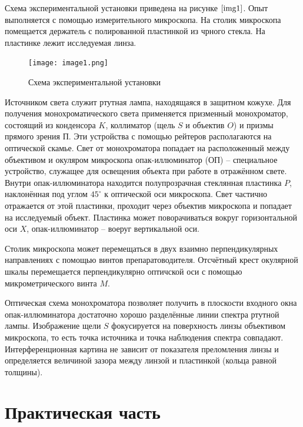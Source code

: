 \documentclass[a4paper,12pt]{article} %
\begin{document}
Схема экспериментальной установки приведена на рисунке $\ref{img1}$. Опыт выполняется с помощью измерительного микроскопа. На столик микроскопа помещается держатель с полированной пластинкой из чрного стекла. На пластинке лежит исследуемая линза.

\begin{figure}[h]
    \begin{center}
        \texttt{[image: image1.png]}
    \end{center}
    \caption{Схема экспериментальной установки}
    \label{img1}
\end{figure}

Источником света служит ртутная лампа, находящаяся в защитном кожухе. Для получения монохроматического света применяется призменный монохроматор, состоящий из конденсора $K$, коллиматор (щель $S$ и объектив $O$) и призмы прямого зрения $\text{П}$. Эти устройства с помощью рейтеров располагаются на оптической скамье. Свет от монохроматора попадает на расположенный между объективом и окуляром микроскопа опак-иллюминатор ($\text{ОП}$) -- специальное устройство, служащее для освещения объекта при работе в отражённом свете. Внутри опак-иллюминатора находится полупрозрачная стеклянная пластинка $P$, наклонённая под углом $45^{\circ}$ к оптической оси микроскопа. Свет частично отражается от этой пластинки, проходит через объектив микроскопа и попадает на исследуемый объект. Пластинка может поворачиваться вокруг горизонтальной оси $X$, опак-иллюминатор -- воеруг вертикальной оси.

Столик микроскопа может перемещаться в двух взаимно перпендикулярных направлениях с помощью винтов препаратоводителя. Отсчётный крест окулярной шкалы перемещается перпендикулярно оптичской оси с помощью микрометрического винта $M$.

Оптическая схема монохроматора позволяет получить в плоскости входного окна опак-иллюминатора достаточно хорошо разделённые линии спектра ртутной лампы. Изображение щели $S$ фокусируется на поверхность линзы объективом микроскопа, то есть точка источника и точка наблюдения спектра совпадают. Интерференционная картина не зависит от показателя преломления линзы и определяется величиной зазора между линзой и пластинкой (кольца равной толщины).

\newpage

\section{Практическая часть}
\end{document}
